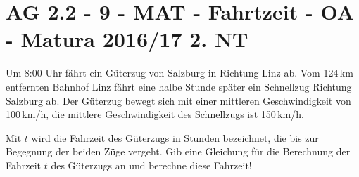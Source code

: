\section{AG 2.2 - 9 - MAT - Fahrtzeit - OA - Matura 2016/17 2. NT}

\begin{beispiel}{1} %
Um 8:00 Uhr fährt ein Güterzug von Salzburg in Richtung Linz ab. Vom 124\,km entfernten Bahnhof Linz fährt eine halbe Stunde später ein Schnellzug Richtung Salzburg ab. Der Güterzug bewegt sich mit einer mittleren Geschwindigkeit von 100\,km/h, die mittlere Geschwindigkeit des Schnellzugs ist 150\,km/h. \leer

Mit $t$ wird die Fahrzeit des Güterzugs in Stunden bezeichnet, die bis zur Begegnung der beiden Züge vergeht. Gib eine Gleichung für die Berechnung der Fahrzeit $t$ des Güterzugs an und berechne diese Fahrzeit!

\end{beispiel}